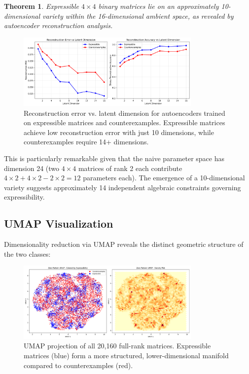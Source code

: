 \documentclass[11pt]{amsart}
\theoremstyle{plain}
\newtheorem{theorem}{Theorem}
\theoremstyle{definition}
\theoremstyle{remark}
\begin{document}
\begin{theorem}
Expressible $4 \times 4$ binary matrices lie on an approximately 10-dimensional variety within the 16-dimensional ambient space, as revealed by autoencoder reconstruction analysis.
\end{theorem}

\begin{figure}[H]
\centering
\includegraphics[width=0.8\textwidth]{../autoencoder_dimension_analysis.png}
\caption{Reconstruction error vs. latent dimension for autoencoders trained on expressible matrices and counterexamples. Expressible matrices achieve low reconstruction error with just 10 dimensions, while counterexamples require 14+ dimensions.}
\end{figure}

This is particularly remarkable given that the naive parameter space has dimension 24 (two $4 \times 4$ matrices of rank 2 each contribute $4 \times 2 + 4 \times 2 - 2 \times 2 = 12$ parameters each). The emergence of a 10-dimensional variety suggests approximately 14 independent algebraic constraints governing expressibility.

\subsection{UMAP Visualization}

Dimensionality reduction via UMAP reveals the distinct geometric structure of the two classes:

\begin{figure}[H]
\centering
\includegraphics[width=0.8\textwidth]{../umap.png}
\caption{UMAP projection of all 20,160 full-rank matrices. Expressible matrices (blue) form a more structured, lower-dimensional manifold compared to counterexamples (red).}
\end{figure}
\end{document}
